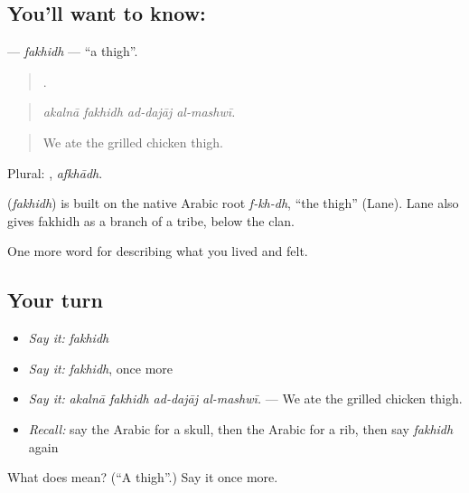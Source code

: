 \subsection*{You'll want to know: }
\textbf{} — \emph{fakhidh} — \textquotedblleft{}a thigh\textquotedblright{}.

\begin{quote}
   .
\end{quote}

\begin{quote}
\emph{akalnā fakhidh ad-dajāj al-mashwī.}
\end{quote}

\begin{quote}
We ate the grilled chicken thigh.
\end{quote}

Plural: , \emph{afkhādh}.

\begin{cousinweb}
\textbf{} (\emph{fakhidh}) is built on the native Arabic root \emph{f-kh-dh}, \textquotedblleft{}the thigh\textquotedblright{} (Lane). Lane also gives fakhidh as a branch of a tribe, below the clan.
\end{cousinweb}

\begin{grammarlens}[title={What you've built}]
One more word for describing what you lived and felt.
\end{grammarlens}

\subsection*{Your turn}
\begin{itemize}
\raggedright
  \item \emph{Say it:} \emph{fakhidh}
  \item \emph{Say it:} \emph{fakhidh}, once more
  \item \emph{Say it:} \emph{akalnā fakhidh ad-dajāj al-mashwī.} — We ate the grilled chicken thigh.
  \item \emph{Recall:} say the Arabic for a skull, then the Arabic for a rib, then say \emph{fakhidh} again
\end{itemize}

\begin{tcolorbox}[breakable,colback=teal!4,colframe=teal!35!black,title={Before you move on}]
What does  mean? (\textquotedblleft{}A thigh\textquotedblright{}.) Say it once more.
\end{tcolorbox}
